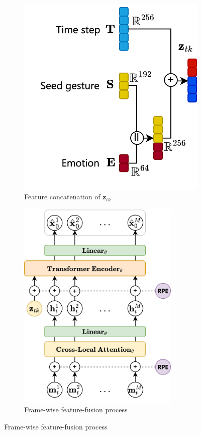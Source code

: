 \begin{figure}[h]
	\centering
	\begin{subfigure}{0.42\linewidth}
		\centering
		\includegraphics[width=0.95\linewidth]{figures/FeatureConcatenate}
		\caption{Feature concatenation of $\mathbf{z}_{tk}$}
		\label{fig:FeatureFusion}
	\end{subfigure}
	\hfill
	\begin{subfigure}{0.55\linewidth}
		\centering
		\includegraphics[width=0.85\textwidth]{figures/FeatureFusion}
		\caption{Frame-wise feature-fusion process}
		\label{fig:ZToken}
	\end{subfigure}
\end{figure}

